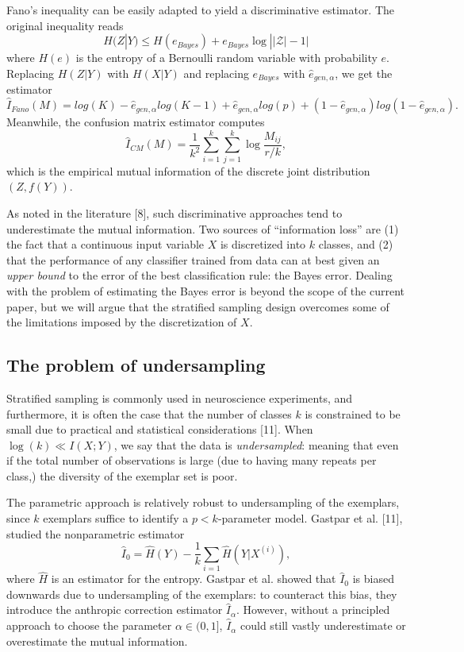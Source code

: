 \documentclass{article}
\begin{document}
Fano's inequality can be easily adapted to yield a discriminative
estimator.  The original inequality reads
\[
H(Z|Y) \leq H(e_{Bayes}) + e_{Bayes} \log ||\mathcal{Z}| - 1|
\]
where $H(e)$ is the entropy of a Bernoulli random variable with
probability $e$.  Replacing $H(Z|Y)$ with $H(X|Y)$ and replacing
$e_{Bayes}$ with $\hat{e}_{gen, \alpha}$, we get the estimator
\[
\hat{I}_{Fano}(M) = log(K) - \hat{e}_{gen, \alpha} log(K-1) + \hat{e}_{gen, \alpha} log(p) + (1-\hat{e}_{gen, \alpha}) log(1-\hat{e}_{gen, \alpha}).
\]
Meanwhile, the confusion matrix estimator computes
\[
\hat{I}_{CM}(M) = \frac{1}{k^2} \sum_{i=1}^k \sum_{j=1}^k \log \frac{M_{ij}}{r/k},
\]
which is the empirical mutual information of the discrete joint
distribution $(Z, f(Y))$.

As noted in the literature [8], such discriminative
approaches tend to underestimate the mutual information.  Two sources
of ``information loss'' are (1) the fact that a continuous input
variable $X$ is discretized into $k$ classes, and (2) that the
performance of any classifier trained from data can at best given an
\emph{upper bound} to the error of the best classification rule: the
Bayes error.  Dealing with the problem of estimating the Bayes error
is beyond the scope of the current paper, but we will argue that the
stratified sampling design overcomes some of the limitations imposed
by the discretization of $X$.

\subsection{The problem of undersampling}

Stratified sampling is commonly used in neuroscience experiments, and
furthermore, it is often the case that the number of classes $k$ is
constrained to be small due to practical and statistical
considerations [11].  When $\log(k) \ll I(X; Y)$, we say
that the data is \emph{undersampled}: meaning that even if the total
number of observations is large (due to having many repeats per
class,) the diversity of the exemplar set is poor.

The parametric approach is relatively robust to undersampling of the
exemplars, since $k$ exemplars suffice to identify a $p < k$-parameter
model.  Gastpar et al. [11], studied the nonparametric estimator
\[
\hat{I}_0 = \hat{H}(Y) - \frac{1}{k}\sum_{i=1}\hat{H}(Y|X^{(i)}),
\]
where $\hat{H}$ is an estimator for the entropy.  Gastpar et
al. showed that $\hat{I}_0$ is biased downwards due to undersampling
of the exemplars: to counteract this bias, they introduce the
anthropic correction estimator $\hat{I}_\alpha$.  However, without a
principled approach to choose the parameter $\alpha \in (0,1]$,
  $\hat{I}_\alpha$ could still vastly underestimate or overestimate
  the mutual information.
\end{document}
